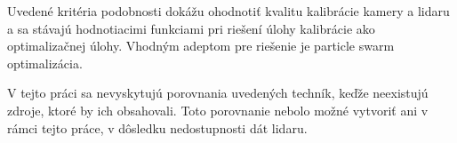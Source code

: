 \documentclass[12pt, a4paper]{article}
\begin{document}
Uvedené kritéria podobnosti dokážu ohodnotiť kvalitu kalibrácie kamery a lidaru a sa stávajú hodnotiacimi funkciami pri riešení úlohy kalibrácie ako optimalizačnej úlohy. Vhodným adeptom pre riešenie je particle swarm optimalizácia.

V tejto práci sa nevyskytujú porovnania uvedených techník, keďže neexistujú zdroje, ktoré by ich obsahovali. Toto porovnanie nebolo možné vytvoriť ani v rámci tejto práce, v dôsledku nedostupnosti dát lidaru.



\begin{flushleft}
  
\end{flushleft}
\end{document}
